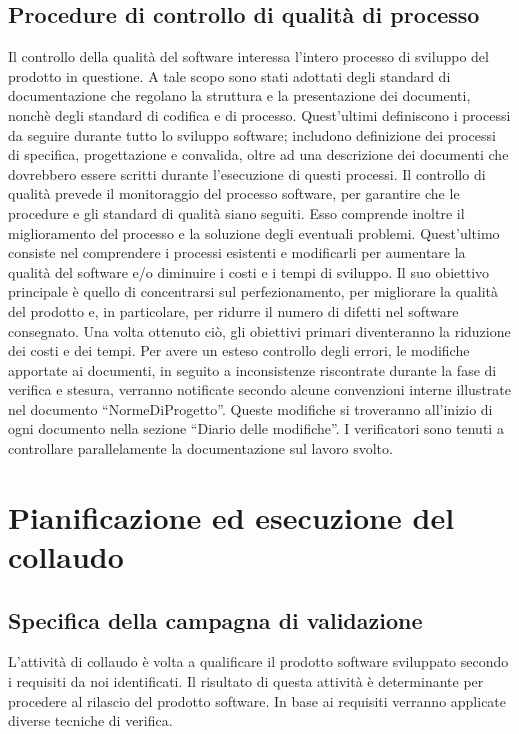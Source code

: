 \documentclass[11pt,titlepage,a4paper]{report}
\begin{document}
\section{Procedure di controllo di qualit\`a di processo}
Il controllo della qualit\`a del software interessa l'intero processo di sviluppo del prodotto in questione. A tale scopo sono stati adottati degli standard di documentazione che regolano la struttura e la presentazione dei documenti, nonch\`e degli standard di codifica e di processo. Quest'ultimi definiscono i processi da seguire durante tutto lo sviluppo software; includono definizione dei processi di specifica, progettazione e convalida, oltre ad una descrizione dei documenti che dovrebbero essere scritti durante l'esecuzione di questi processi. Il controllo di qualit\`a prevede il monitoraggio del processo software, per garantire che le procedure e gli standard di qualit\`a siano seguiti. Esso comprende inoltre il miglioramento del processo e la soluzione degli eventuali problemi. Quest'ultimo consiste nel comprendere i processi esistenti e modificarli per aumentare la qualit\`a del software e/o diminuire i costi e i tempi di sviluppo. Il suo obiettivo principale \`e quello di concentrarsi sul perfezionamento, per migliorare la qualit\`a del prodotto e, in particolare, per ridurre il numero di difetti nel software consegnato. Una volta ottenuto ci\`o, gli obiettivi primari diventeranno la riduzione dei costi e dei tempi.
Per avere un esteso controllo degli errori, le modifiche apportate ai documenti, in seguito a inconsistenze riscontrate durante la fase di verifica e stesura, verranno notificate secondo alcune convenzioni interne illustrate nel documento ``NormeDiProgetto''. Queste modifiche si troveranno all'inizio di ogni documento nella sezione ``Diario delle modifiche''. I verificatori sono tenuti a controllare parallelamente la documentazione sul lavoro svolto.

\chapter[Collaudo]{Pianificazione ed esecuzione del collaudo}
\section[Campagna di validazione]{Specifica della campagna di validazione}
L'attivit\`a di collaudo \`e volta a qualificare il prodotto software sviluppato secondo i requisiti da noi identificati. Il risultato di questa attivit\`a \`e determinante per procedere al rilascio del prodotto software. In base ai requisiti verranno applicate diverse tecniche di verifica.
\end{document}
